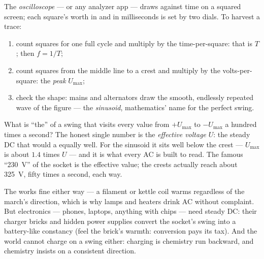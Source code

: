 \begin{method}\label{met:g9:alternating-current:scope}
The \emph{oscilloscope} --- or any
analyzer app --- draws  against time on a squared
screen; each square's worth in  and in milliseconds is
set by two dials. To harvest a trace:
\begin{enumerate}
  \item count squares for one full cycle and multiply by the
        time-per-square: that is $T$; then $f = 1/T$;
  \item count squares from the middle line to a crest and
        multiply by the volts-per-square: the \emph{peak
        } $U_{\text{max}}$;
  \item check the shape: mains and alternators draw the
        smooth, endlessly repeated wave of the figure ---
        the \emph{sinusoid}, mathematics' name for the
        perfect swing.
\end{enumerate}
\end{method}

\begin{proposition}\label{prop:g9:alternating-current:effective}
What is ``the''  of a swing that visits every value
from $+U_{\text{max}}$ to $-U_{\text{max}}$ a hundred times a
second? The honest single number is the \emph{effective
voltage} $U$: the steady DC 
that would  a  equally well. For the sinusoid it
sits well below the crest --- $U_{\text{max}}$ is about $1.4$
times $U$ --- and it is what every AC  is built to
read. The famous ``\qty{230}{V}'' of the socket is the
effective value; the crests actually reach about
\qty{325}{V}, fifty times a second, each way.
\end{proposition}

\begin{example}\label{ex:g9:alternating-current:whocares}
The  works fine either way --- a filament or
kettle coil warms regardless of the march's direction, which
is why lamps and heaters drink AC without complaint. But
electronics --- phones, laptops, anything with chips ---
need steady DC: their charger bricks and hidden power
supplies convert the socket's swing into a battery-like
constancy (feel the brick's warmth: conversion pays its
tax). And the  world cannot charge on a swing either:
charging is chemistry run backward, and chemistry insists on
a consistent direction.
\end{example}

